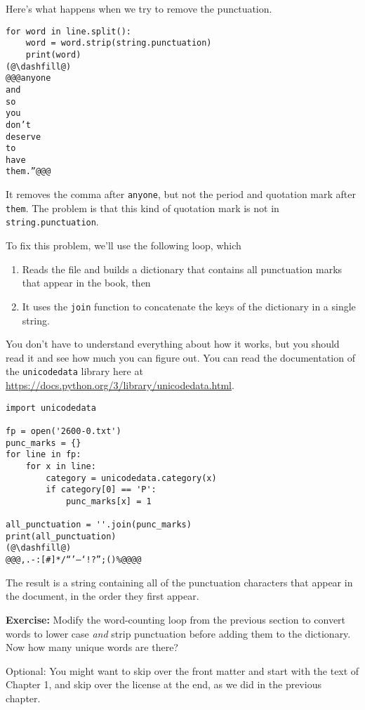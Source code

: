 Here's what happens when we try to remove the punctuation.

\begin{lstlisting}[]
for word in line.split():
    word = word.strip(string.punctuation)
    print(word)
(@\dashfill@)
@@@anyone
and
so
you
don’t
deserve
to
have
them.”@@@
\end{lstlisting}

It removes the comma after \passthrough{\lstinline!anyone!}, but not the
period and quotation mark after \passthrough{\lstinline!them!}. The
problem is that this kind of quotation mark is not in
\passthrough{\lstinline!string.punctuation!}.

To fix this problem, we'll use the following loop, which

\begin{enumerate}
\def\labelenumi{\arabic{enumi}.}
\item
  Reads the file and builds a dictionary that contains all punctuation
  marks that appear in the book, then
\item
  It uses the \passthrough{\lstinline!join!} function to concatenate the
  keys of the dictionary in a single string.
\end{enumerate}

You don't have to understand everything about how it works, but you
should read it and see how much you can figure out. You can read the
documentation of the \passthrough{\lstinline!unicodedata!} library here
at \url{https://docs.python.org/3/library/unicodedata.html}.

\begin{lstlisting}[]
import unicodedata

fp = open('2600-0.txt')
punc_marks = {}
for line in fp:
    for x in line:
        category = unicodedata.category(x)
        if category[0] == 'P':
            punc_marks[x] = 1
        
all_punctuation = ''.join(punc_marks)
print(all_punctuation)
(@\dashfill@)
@@@,.-:[#]*/“’—‘!?”;()%@@@@
\end{lstlisting}

The result is a string containing all of the punctuation characters that
appear in the document, in the order they first appear.

\textbf{Exercise:} Modify the word-counting loop from the previous
section to convert words to lower case \emph{and} strip punctuation
before adding them to the dictionary. Now how many unique words are
there?

Optional: You might want to skip over the front matter and start with
the text of Chapter 1, and skip over the license at the end, as we did
in the previous chapter.


